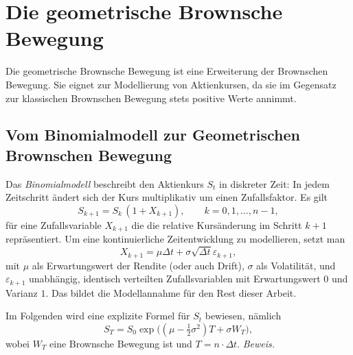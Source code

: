 \section{Die geometrische Brownsche Bewegung}

Die geometrische Brownsche Bewegung ist eine Erweiterung der Brownschen Bewegung. 
Sie eignet zur Modellierung von Aktienkursen, da sie im Gegensatz zur klassischen 
Brownschen Bewegung stets positive Werte annimmt.

\subsection{Vom Binomialmodell zur Geometrischen Brownschen Bewegung}

Das \textit{Binomialmodell} beschreibt den Aktienkurs $S_t$ in diskreter Zeit: In jedem Zeitschritt ändert sich der Kurs multiplikativ um einen Zufallsfaktor. Es gilt
$$
S_{k+1} = S_k \,(1 + X_{k+1}), \qquad k = 0,1,\dots,n-1,
$$
für eine Zufallsvariable $X_{k+1}$ die die relative Kursänderung im Schritt $k+1$ repräsentiert. Um eine kontinuierliche Zeitentwicklung zu modellieren, setzt man
$$
X_{k+1} = \mu  \Delta t + \sigma \sqrt{\Delta t}\varepsilon_{k+1},
$$
mit $\mu$ als Erwartungswert der Rendite (oder auch Drift), $\sigma$ als Volatilität, und $\varepsilon_{k+1}$ unabhängig, identisch verteilten Zufallsvariablen mit Erwartungswert $0$ und Varianz $1$. Das bildet die Modellannahme für den Rest dieser Arbeit.

Im Folgenden wird eine explizite Formel für $S_t$ bewiesen, nämlich
$$S_T = S_0 \exp\!\Big( (\mu - \tfrac12 \sigma^2)T + \sigma W_T \Big),$$
wobei $W_T$ eine Brownsche Bewegung ist und $T=n \cdot \Delta t$. \textit{Beweis.}

